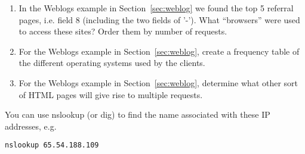 \begin{enumerate}
\item In the Weblogs example in Section~\ref{sec:weblog} we found the
  top 5 referral pages, i.e. field 8 (including the two fields of '-').
 What ``browsers'' were used to access these sites?
Order them by number of requests.

\item For the Weblogs example in Section~\ref{sec:weblog}, create a
 frequency table of the different operating systems used by the clients.

\item For the Weblogs example in Section~\ref{sec:weblog}, determine
what other sort of HTML pages will give rise to multiple requests.

\begin{comment}
\textit{ What other sort of HTML page will give rise to multiple
  requests?} Firstly, each request will result in sub-requests for
documents referenced within it such as images, JavaScript files, etc.
Another type of page that will produce (multiple) sub-requests is an
HTML document made up of ``frames'', i.e.  separate documents in the
same browser page.  Each sub-document within the screen will be
requested separately.  Similarly, when one visits a site, an icon for
the site is often displayed in the URI field of the browser to provide
a quick visual reference of the identity of the page's host site.
\end{comment}

 


\end{enumerate}


You can use nslookup (or dig) to find the name associated with these IP
addresses, e.g. 
\begin{verbatim}
nslookup 65.54.188.109
\end{verbatim}
